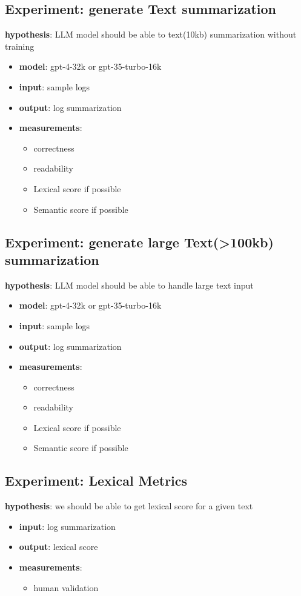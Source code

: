 \documentclass[conference]{IEEEtran}
\begin{document}
\subsection{Experiment: generate Text summarization}
\textbf{hypothesis}: LLM model should be able to text(10kb) summarization without training
\begin{itemize}
    \item \textbf{model}: gpt-4-32k or gpt-35-turbo-16k 
    \item \textbf{input}: sample logs
    \item \textbf{output}: log summarization
    \item \textbf{measurements}:
    \begin{itemize}
        \item correctness
        \item readability
        \item Lexical score if possible
        \item Semantic score if possible
    \end{itemize}
\end{itemize}

\subsection{Experiment: generate large Text(>100kb) summarization}
\textbf{hypothesis}: LLM model should be able to handle large text input
\begin{itemize}
    \item \textbf{model}: gpt-4-32k or gpt-35-turbo-16k 
    \item \textbf{input}: sample logs
    \item \textbf{output}: log summarization
    \item \textbf{measurements}:
    \begin{itemize}
        \item correctness
        \item readability
        \item Lexical score if possible
        \item Semantic score if possible
    \end{itemize}
\end{itemize}


\subsection{Experiment: Lexical Metrics}
\textbf{hypothesis}: we should be able to get lexical score for a given text
\begin{itemize}
    \item \textbf{input}: log summarization
    \item \textbf{output}: lexical score 
    \item \textbf{measurements}:
    \begin{itemize}
        \item human validation
    \end{itemize}
\end{itemize}
\end{document}
